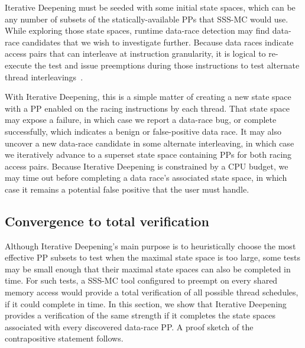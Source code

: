 Iterative Deepening must be seeded with some initial state spaces,
which can be any number of subsets of the statically-available PPs that SSS-MC would use.
While exploring those state spaces, runtime data-race detection may find data-race candidates that we wish to investigate further.
Because data races indicate access pairs that can interleave at instruction granularity,
it is logical to re-execute the test and issue preemptions during those instructions to test alternate thread interleavings~\cite{racefuzzer,portend}.

With Iterative Deepening, this is a simple matter of creating a new state space with a PP enabled on the racing instructions by each thread.
That state space may expose a failure, in which case we report a data-race bug,
or complete successfully, which indicates a benign or false-positive data race.
It may also uncover a new data-race candidate in some alternate interleaving,
in which case we iteratively advance to a superset state space containing PPs for both racing access pairs.
Because Iterative Deepening is constrained by a CPU budget,
we may time out before completing a data race's associated state space,
in which case it remains a potential false positive that the user must handle.

\subsection{Convergence to total verification}
\label{sec:totalverif}

Although Iterative Deepening's main purpose is to heuristically choose the most effective PP subsets to test
when the maximal state space is too large,
some tests may be small enough that their maximal state spaces can also be completed in time.
For such tests, a SSS-MC tool configured to preempt on every shared memory access \cite{spin} would provide a total verification of all possible thread schedules, if it could complete in time.
In this section, we show that Iterative Deepening provides a verification of the same strength if it completes the state spaces associated with every discovered data-race PP.
A proof sketch of the contrapositive statement follows.

